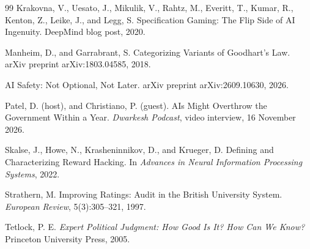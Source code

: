 \documentclass[11pt]{article}
\begin{document}
\begin{thebibliography}{99}
Krakovna, V., Uesato, J., Mikulik, V., Rahtz, M., Everitt, T., Kumar, R., Kenton, Z., Leike, J., and Legg, S.
\newblock Specification Gaming: The Flip Side of AI Ingenuity.
\newblock DeepMind blog post, 2020.

Manheim, D., and Garrabrant, S.
\newblock Categorizing Variants of Goodhart's Law.
\newblock arXiv preprint arXiv:1803.04585, 2018.

AI Safety: Not Optional, Not Later.
\newblock arXiv preprint arXiv:2609.10630, 2026.

Patel, D. (host), and Christiano, P. (guest).
\newblock AIs Might Overthrow the Government Within a Year.
\newblock \emph{Dwarkesh Podcast}, video interview, 16 November 2026.

Skalse, J., Howe, N., Krasheninnikov, D., and Krueger, D.
\newblock Defining and Characterizing Reward Hacking.
\newblock In \emph{Advances in Neural Information Processing Systems}, 2022.

Strathern, M.
\newblock Improving Ratings: Audit in the British University System.
\newblock \emph{European Review}, 5(3):305--321, 1997.

Tetlock, P. E.
\newblock \emph{Expert Political Judgment: How Good Is It? How Can We Know?}
\newblock Princeton University Press, 2005.

\end{thebibliography}
\end{document}
